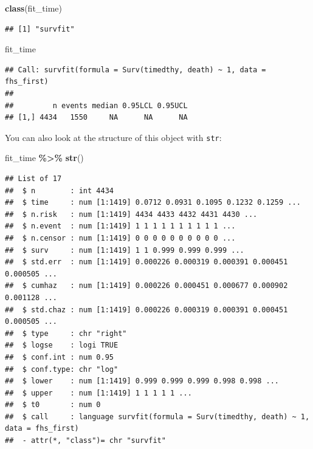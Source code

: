 \documentclass[
]{book}
\newenvironment{Shaded}{\begin{snugshade}}{\end{snugshade}}
\newcommand{\FunctionTok}[1]{\textcolor[rgb]{0.13,0.29,0.53}{\textbf{#1}}}
\newcommand{\NormalTok}[1]{#1}
\newcommand{\SpecialCharTok}[1]{\textcolor[rgb]{0.81,0.36,0.00}{\textbf{#1}}}
\begin{document}
\begin{Shaded}
\begin{Highlighting}[]
\FunctionTok{class}\NormalTok{(fit\_time)}
\end{Highlighting}
\end{Shaded}

\begin{verbatim}
## [1] "survfit"
\end{verbatim}

\begin{Shaded}
\begin{Highlighting}[]
\NormalTok{fit\_time}
\end{Highlighting}
\end{Shaded}

\begin{verbatim}
## Call: survfit(formula = Surv(timedthy, death) ~ 1, data = fhs_first)
## 
##         n events median 0.95LCL 0.95UCL
## [1,] 4434   1550     NA      NA      NA
\end{verbatim}

You can also look at the structure of this object with \texttt{str}:

\begin{Shaded}
\begin{Highlighting}[]
\NormalTok{fit\_time }\SpecialCharTok{\%\textgreater{}\%} 
  \FunctionTok{str}\NormalTok{() }
\end{Highlighting}
\end{Shaded}

\begin{verbatim}
## List of 17
##  $ n        : int 4434
##  $ time     : num [1:1419] 0.0712 0.0931 0.1095 0.1232 0.1259 ...
##  $ n.risk   : num [1:1419] 4434 4433 4432 4431 4430 ...
##  $ n.event  : num [1:1419] 1 1 1 1 1 1 1 1 1 1 ...
##  $ n.censor : num [1:1419] 0 0 0 0 0 0 0 0 0 0 ...
##  $ surv     : num [1:1419] 1 1 0.999 0.999 0.999 ...
##  $ std.err  : num [1:1419] 0.000226 0.000319 0.000391 0.000451 0.000505 ...
##  $ cumhaz   : num [1:1419] 0.000226 0.000451 0.000677 0.000902 0.001128 ...
##  $ std.chaz : num [1:1419] 0.000226 0.000319 0.000391 0.000451 0.000505 ...
##  $ type     : chr "right"
##  $ logse    : logi TRUE
##  $ conf.int : num 0.95
##  $ conf.type: chr "log"
##  $ lower    : num [1:1419] 0.999 0.999 0.999 0.998 0.998 ...
##  $ upper    : num [1:1419] 1 1 1 1 1 ...
##  $ t0       : num 0
##  $ call     : language survfit(formula = Surv(timedthy, death) ~ 1, data = fhs_first)
##  - attr(*, "class")= chr "survfit"
\end{verbatim}
\end{document}
